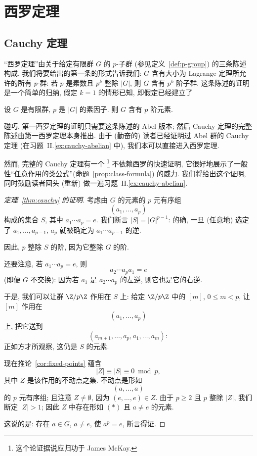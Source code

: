 \section{西罗定理}
\label{subsec:sylow}

\subsection{Cauchy 定理}
\label{subsec:cauchy}

``西罗定理''由关于给定有限群 $G$ 的 $p$-子群 (参见定义~\ref{def:p-group}) 的三条陈述构成. 我们将要给出的第一条的形式告诉我们: $G$ 含有大小为 Lagrange 定理所允许的所有 $p$-群: 若 $p$ 是素数且 $p^k$ 整除 $|G|$, 则 $G$ 含有 $p^k$ 阶子群. 这条陈述的证明是一个简单的归纳, 假定 $k = 1$ 的情形已知, 即假定已经建立了

\begin{theorem}[Cauchy 定理]
\label{thm:cauchy}
设 $G$ 是有限群, $p$ 是 $|G|$ 的素因子. 则 $G$ 含有 $p$ 阶元素.
\end{theorem}

碰巧, 第一西罗定理的证明只需要这条陈述的 Abel 版本; 然后 Cauchy 定理的完整陈述由第一西罗定理本身推出. 由于 (勤奋的) 读者已经证明过 Abel 群的 Cauchy 定理 (在习题~II.\ref{ex:cauchy-abelian} 中), 我们本可以直接进入西罗定理.

然而, 完整的 Cauchy 定理有一个%
\footnote{这个论证据说应归功于 James McKay.}%
不依赖西罗的快速证明, 它很好地展示了一般性``任意作用的类公式''(命题~\ref{prop:class-formula}) 的威力. 我们将给出这个证明, 同时鼓励读者回头 (重新) 做一遍习题~II.\ref{ex:cauchy-abelian}.

\begin{proof}[定理~\ref{thm:cauchy} 的证明]
考虑由 $G$ 的元素的 $p$ 元有序组
\[
(a_1, \dots, a_p)
\]
构成的集合 $S$, 其中 $a_1 \cdots a_p = e$. 我们断言 $|S| = |G|^{p-1}$: 的确, 一旦 (任意地) 选定了 $a_1, \ldots, a_{p-1}$, $a_p$ 就被确定为 $a_1 \cdots a_{p-1}$ 的逆.

因此, $p$ 整除 $S$ 的阶, 因为它整除 $G$ 的阶.

还要注意, 若 $a_1 \cdots a_p = e$, 则
\[
a_2 \cdots a_p a_1 = e
\]
(即便 $G$ 不交换): 因为若 $a_1$ 是 $a_2 \cdots a_p$ 的左逆, 则它也是它的右逆.

于是, 我们可以让群 $\Z/p\Z$ 作用在 $S$ 上: 给定 $\Z/p\Z$ 中的 $[m]$, $0 \leq m < p$, 让 $[m]$ 作用在
\[
(a_1, \ldots, a_p)
\]
上, 把它送到
\[
(a_{m+1}, \ldots, a_p, a_1, \ldots, a_m):
\]
正如方才所观察, 这仍是 $S$ 的元素.

现在推论~\ref{cor:fixed-points} 蕴含
\[
|Z| \equiv |S| \equiv 0 \bmod p,
\]
其中 $Z$ 是该作用的不动点之集. 不动点是形如
\begin{equation*}
(a, \dots, a) \tag{$*$}
\end{equation*}
的 $p$ 元有序组; 且注意 $Z \neq \emptyset$, 因为 $(e, \ldots, e) \in Z$. 由于 $p \geq 2$ 且 $p$ 整除 $|Z|$, 我们断定 $|Z| > 1$; 因此 $Z$ 中存在形如 $(*)$ 且 $a \neq e$ 的元素.

这说的是: 存在 $a \in G$, $a \neq e$, 使 $a^p = e$, 断言得证.
\end{proof}

